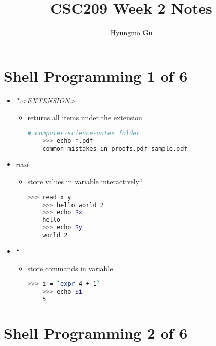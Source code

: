\documentclass[12pt]{article}
\begin{document}
\title{CSC209 Week 2 Notes}
\author{Hyungmo Gu}
\maketitle

\section*{Shell Programming 1 of 6}
\begin{itemize}
    \item \textit{*.\textless EXTENSION\textgreater}
    \begin{itemize}
    \item returns all items under the extension

    \begin{lstlisting}[language=bash]
    # computer-science-notes folder
    >>> echo *.pdf
    common_mistakes_in_proofs.pdf sample.pdf
    \end{lstlisting}

    \end{itemize}
    \item \textit{read}
    \begin{itemize}
    \item store values in variable interactively``

    \begin{lstlisting}[language=bash]
    >>> read x y
    >>> hello world 2
    >>> echo $x
    hello
    >>> echo $y
    world 2
    \end{lstlisting}

    \end{itemize}
    \item \textit{``}
    \begin{itemize}
    \item store commands in variable

    \begin{lstlisting}[language=bash]
    >>> i = `expr 4 + 1`
    >>> echo $i
    5
    \end{lstlisting}
    \end{itemize}
\end{itemize}

\bigskip

\section*{Shell Programming 2 of 6}

\bigskip
\end{document}
